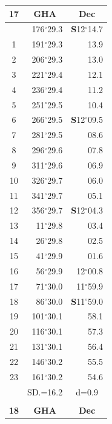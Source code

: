 \documentclass[10pt, a4paper]{report}
\begin{document}
\begin{scriptsize}
\noindent
\begin{tabular*}{0.2\textwidth}[t]{@{\extracolsep{\fill}}|c|rr|}
\hline
\multicolumn{1}{|c|}{\rule{0pt}{2.6ex}\textbf{17}} & \multicolumn{1}{c}{\textbf{GHA}} & \multicolumn{1}{c|}{\textbf{Dec}}\\
\hline\rule{0pt}{2.6ex}\noindent
0 & 176$^\circ$29.3 & \textbf{S}12$^\circ$14.7\\
1 & 191$^\circ$29.3 & 13.9\\
2 & 206$^\circ$29.3 & 13.0\\
3 & 221$^\circ$29.4 & \raisebox{0.24ex}{\boldmath$\cdot$~\boldmath$\cdot$~~}12.1\\
4 & 236$^\circ$29.4 & 11.2\\
5 & 251$^\circ$29.5 & 10.4\\[2Pt]
6 & 266$^\circ$29.5 & \textbf{S}12$^\circ$09.5\\
7 & 281$^\circ$29.5 & 08.6\\
8 & 296$^\circ$29.6 & 07.8\\
9 & 311$^\circ$29.6 & \raisebox{0.24ex}{\boldmath$\cdot$~\boldmath$\cdot$~~}06.9\\
10 & 326$^\circ$29.7 & 06.0\\
11 & 341$^\circ$29.7 & 05.1\\[2Pt]
12 & 356$^\circ$29.7 & \textbf{S}12$^\circ$04.3\\
13 & 11$^\circ$29.8 & 03.4\\
14 & 26$^\circ$29.8 & 02.5\\
15 & 41$^\circ$29.9 & \raisebox{0.24ex}{\boldmath$\cdot$~\boldmath$\cdot$~~}01.6\\
16 & 56$^\circ$29.9 & 12$^\circ$00.8\\
17 & 71$^\circ$30.0 & 11$^\circ$59.9\\[2Pt]
18 & 86$^\circ$30.0 & \textbf{S}11$^\circ$59.0\\
19 & 101$^\circ$30.1 & 58.1\\
20 & 116$^\circ$30.1 & 57.3\\
21 & 131$^\circ$30.1 & \raisebox{0.24ex}{\boldmath$\cdot$~\boldmath$\cdot$~~}56.4\\
22 & 146$^\circ$30.2 & 55.5\\
23 & 161$^\circ$30.2 & 54.6\\
\hline
\rule{0pt}{2.4ex} & \multicolumn{1}{c}{SD.=16.2} & \multicolumn{1}{c|}{d=0.9}\\
\hline
\multicolumn{1}{c}{}\\[-0.5ex]\hline
\multicolumn{1}{|c|}{\rule{0pt}{2.6ex}\textbf{18}} & \multicolumn{1}{c}{\textbf{GHA}} & \multicolumn{1}{c|}{\textbf{Dec}}\\

\end{tabular*}
\end{scriptsize}
\end{document}
